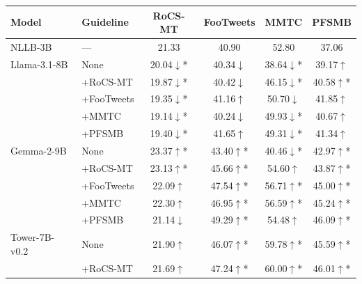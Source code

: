 \begin{tabular}{llcccc}
\toprule
Model & Guideline & RoCS-MT & FooTweets & MMTC & PFSMB \\
\midrule
NLLB-3B & — & 21.33 & 40.90 & 52.80 & 37.06 \\
Llama-3.1-8B & None & 20.04\colorbox{myred}{$\downarrow$}* & 40.34\colorbox{myred}{$\downarrow$} & 38.64\colorbox{myred}{$\downarrow$}* & 39.17\colorbox{mygreen}{$\uparrow$} \\
 & +RoCS-MT & 19.87\colorbox{myred}{$\downarrow$}* & 40.42\colorbox{myred}{$\downarrow$} & 46.15\colorbox{myred}{$\downarrow$}* & 40.58\colorbox{mygreen}{$\uparrow$}* \\
 & +FooTweets & 19.35\colorbox{myred}{$\downarrow$}* & 41.16\colorbox{mygreen}{$\uparrow$} & 50.70\colorbox{myred}{$\downarrow$} & 41.85\colorbox{mygreen}{$\uparrow$} \\
 & +MMTC & 19.14\colorbox{myred}{$\downarrow$}* & 40.24\colorbox{myred}{$\downarrow$} & 49.93\colorbox{myred}{$\downarrow$}* & 40.67\colorbox{mygreen}{$\uparrow$} \\
 & +PFSMB & 19.40\colorbox{myred}{$\downarrow$}* & 41.65\colorbox{mygreen}{$\uparrow$} & 49.31\colorbox{myred}{$\downarrow$}* & 41.34\colorbox{mygreen}{$\uparrow$} \\
Gemma-2-9B & None & 23.37\colorbox{mygreen}{$\uparrow$}* & 43.40\colorbox{mygreen}{$\uparrow$}* & 40.46\colorbox{myred}{$\downarrow$}* & 42.97\colorbox{mygreen}{$\uparrow$}* \\
 & +RoCS-MT & 23.13\colorbox{mygreen}{$\uparrow$}* & 45.66\colorbox{mygreen}{$\uparrow$}* & 54.60\colorbox{mygreen}{$\uparrow$} & 43.87\colorbox{mygreen}{$\uparrow$}* \\
 & +FooTweets & 22.09\colorbox{mygreen}{$\uparrow$} & 47.54\colorbox{mygreen}{$\uparrow$}* & 56.71\colorbox{mygreen}{$\uparrow$}* & 45.00\colorbox{mygreen}{$\uparrow$}* \\
 & +MMTC & 22.30\colorbox{mygreen}{$\uparrow$} & 46.95\colorbox{mygreen}{$\uparrow$}* & 56.59\colorbox{mygreen}{$\uparrow$}* & 45.24\colorbox{mygreen}{$\uparrow$}* \\
 & +PFSMB & 21.14\colorbox{myred}{$\downarrow$} & 49.29\colorbox{mygreen}{$\uparrow$}* & 54.48\colorbox{mygreen}{$\uparrow$} & 46.09\colorbox{mygreen}{$\uparrow$}* \\
Tower-7B-v0.2 & None & 21.90\colorbox{mygreen}{$\uparrow$} & 46.07\colorbox{mygreen}{$\uparrow$}* & 59.78\colorbox{mygreen}{$\uparrow$}* & 45.59\colorbox{mygreen}{$\uparrow$}* \\
 & +RoCS-MT & 21.69\colorbox{mygreen}{$\uparrow$} & 47.24\colorbox{mygreen}{$\uparrow$}* & 60.00\colorbox{mygreen}{$\uparrow$}* & 46.01\colorbox{mygreen}{$\uparrow$}* \\

\end{tabular}
